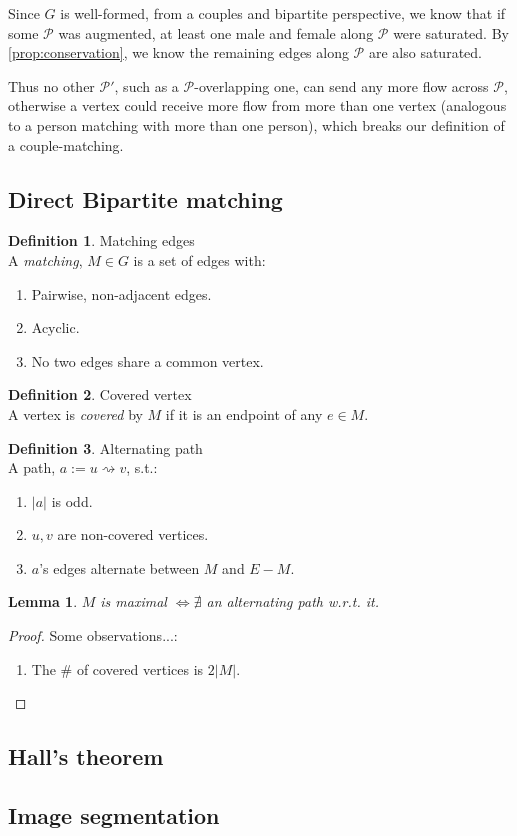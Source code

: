 \documentclass{article}
\newtheorem{lemma}[theorem]{Lemma}
\theoremstyle{definition}
\newtheorem{definition}{Definition}[section]
\begin{document}
Since $G$ is well-formed, from a couples and bipartite perspective, we know that if some $\mathcal{P}$ was augmented, at least one male and female along $\mathcal{P}$ were saturated. By \ref{prop:conservation}, we know the remaining edges along $\mathcal{P}$ are also saturated. 

Thus no other $\mathcal{P'}$, such as a $\mathcal{P}$-overlapping one, can send any more flow across $\mathcal{P}$, otherwise a vertex could receive more flow from more than one vertex (analogous to a person matching with more than one person), which breaks our definition of a couple-matching.

\subsection{Direct Bipartite matching}
\begin{definition}{Matching edges}
\label{def:match_edge}
	\\A \textit{matching}, $M \in G$ is a set of edges with:
	\begin{enumerate}
		\item Pairwise, non-adjacent edges.
		\item Acyclic.
		\item No two edges share a common vertex.
	\end{enumerate}
\end{definition}

\begin{definition}{Covered vertex}
	\label{def:covered_vtx}
	\\A vertex is \textit{covered} by $M$ if it is an endpoint of any $e \in M$.
\end{definition}

\begin{definition}{Alternating path}
	\label{def:alt_path}
	\\A path, $a := u \rightsquigarrow v$, s.t.:
	\begin{enumerate}
		\item $|a|$ is odd.
		\item $u, v$ are non-covered vertices.
		\item $a$'s edges alternate between $M$ and $E-M$.
	\end{enumerate}
\end{definition}

\begin{lemma}
	$M$ is maximal $\iff \nexists$ an alternating path w.r.t. it.
\end{lemma}

\begin{proof}	
	Some observations...:
	\begin{enumerate}
		\item The \# of covered vertices is $2|M|$.
	\end{enumerate}
\end{proof}

\subsection{Hall's theorem}

\subsection{Image segmentation}
\end{document}
